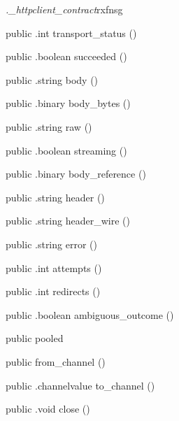 \begin{CrexxClass}{\textit{.\_httpclient\_contract}}{rxfnsg}
\begin{Members}
    \Method
      {public}
      {.int}
      {transport\_status}
      {()}

    \Method
      {public}
      {.boolean}
      {succeeded}
      {()}

    \Method
      {public}
      {.string}
      {body}
      {()}

    \Method
      {public}
      {.binary}
      {body\_bytes}
      {()}

    \Method
      {public}
      {.string}
      {raw}
      {()}

    \Method
      {public}
      {.boolean}
      {streaming}
      {()}

    \Method
      {public}
      {.binary}
      {body\_reference}
      {()}

    \Method
      {public}
      {.string}
      {header}
      {()}

    \Method
      {public}
      {.string}
      {header\_wire}
      {()}

    \Method
      {public}
      {.string}
      {error}
      {()}

    \Method
      {public}
      {.int}
      {attempts}
      {()}

    \Method
      {public}
      {.int}
      {redirects}
      {()}

    \Method
      {public}
      {.boolean}
      {ambiguous\_outcome}
      {()}

    \Factory
      {public}
      {pooled}
      {}

    \Factory
      {public}
      {from\_channel}
      {()}

    \Method
      {public}
      {.channelvalue}
      {to\_channel}
      {()}

    \Method
      {public}
      {.void}
      {close}
      {()}

  \end{Members}
\end{CrexxClass}

